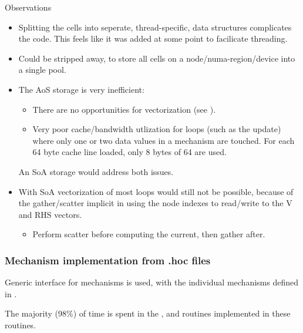 \noindent
Observations
\begin{itemize}
\item
    Splitting the cells into seperate, thread-specific, data structures complicates the code. This feels like it was added at some point to facilicate threading.
\item
    Could be stripped away, to store all cells on a node/numa-region/device into a single pool.
\item
    The AoS storage is very inefficient:
    \begin{itemize}
    \item
        There are no opportunities for vectorization (see ).
    \item
        Very poor cache/bandwidth utlization for loops (such as the  update) where only one or two data values in a mechanism are touched. For each 64 byte cache line loaded, only 8 bytes of 64 are used.
    \end{itemize}
    An SoA storage would address both issues.
\item
    With SoA vectorization of most loops would still not be possible, because of the gather/scatter implicit in using the node indexes to read/write to the V and RHS vectors.
    \begin{itemize}
    \item
        Perform scatter before computing the current, then gather after.
    \end{itemize}
\end{itemize}
\subsubsection{Mechanism implementation from .hoc files}

Generic interface for mechanisms is used, with the individual mechanisms defined in .

The majority (98\%) of time is spent in the ,  and  routines implemented in these routines.


